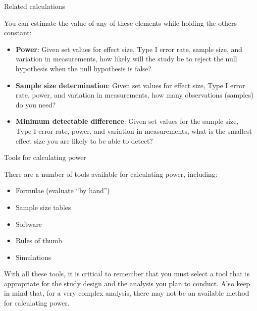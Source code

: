\documentclass[ignorenonframetext,]{beamer}
\providecommand{\tightlist}{%
  \setlength{\itemsep}{0pt}\setlength{\parskip}{0pt}}
\begin{document}
\begin{frame}{Related calculations}

You can estimate the value of any of these elements while holding the
others constant:

\begin{itemize}
\tightlist
\item
  \textbf{Power}: Given set values for effect size, Type I error rate,
  sample size, and variation in measurements, how likely will the study
  be to reject the null hypothesis when the null hypothesis is false?
\item
  \textbf{Sample size determination}: Given set values for effect size,
  Type I error rate, power, and variation in measurements, how many
  observations (samples) do you need?
\item
  \textbf{Minimum detectable difference}: Given set values for the
  sample size, Type I error rate, power, and variation in measurements,
  what is the smallest effect size you are likely to be able to detect?
\end{itemize}

\end{frame}

\begin{frame}{Tools for calculating power}

There are a number of tools available for calculating power, including:

\begin{itemize}
\tightlist
\item
  Formulae (evaluate ``by hand'')
\item
  Sample size tables
\item
  Software
\item
  Rules of thumb
\item
  Simulations
\end{itemize}

With all these tools, it is critical to remember that you must select a
tool that is appropriate for the study design and the analysis you plan
to conduct. Also keep in mind that, for a very complex analysis, there
may not be an available method for calculating power.

\end{frame}
\end{document}
